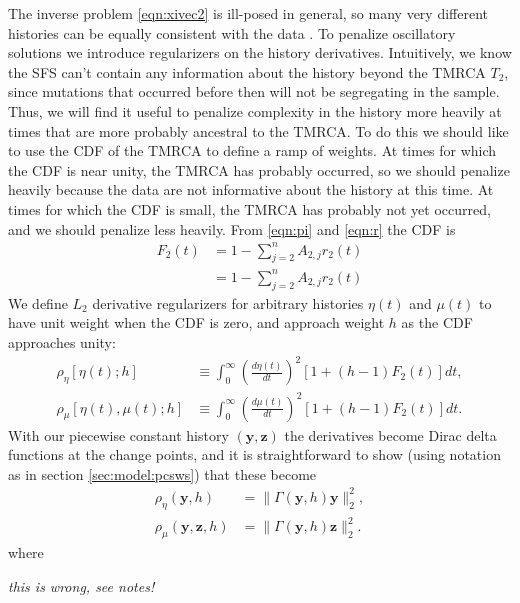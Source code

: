 \documentclass[11pt]{article}
\begin{document}
The inverse problem \eqref{eqn:xivec2} is ill-posed in general, so many very different histories can be equally consistent with the data \citep{oscillation paper? Yun's other papers?}.
To penalize oscillatory solutions we introduce regularizers on the history derivatives.
Intuitively, we know the SFS can't contain any information about the history beyond the TMRCA $T_2$, since mutations that occurred before then will not be segregating in the sample.
Thus, we will find it useful to penalize complexity in the history more heavily at times that are more probably ancestral to the TMRCA.
To do this we should like to use the CDF of the TMRCA to define a ramp of weights.
At times for which the CDF is near unity, the TMRCA has probably occurred, so we should penalize heavily because the data are not informative about the history at this time.
At times for which the CDF is small, the TMRCA has probably not yet occurred, and we should penalize less heavily.
From \eqref{eqn:pi} and \eqref{eqn:r} the CDF is
\begin{align}
F_2(t) &= 1 - \sum_{j=2}^n A_{2,j}r_2(t)\\
&= 1 - \sum_{j=2}^n A_{2,j}r_2(t)
\end{align}
We define $L_2$ derivative regularizers for arbitrary histories $\eta(t)$ and $\mu(t)$ to have unit weight when the CDF is zero, and approach weight $h$ as the CDF approaches unity:
\begin{align}
\rho_\eta[\eta(t); h] &\equiv \int_0^\infty\left(\frac{d\eta(t)}{dt}\right)^2\left[1+(h-1)F_2(t)\right]dt,\\
\rho_\mu[\eta(t), \mu(t); h] &\equiv \int_0^\infty\left(\frac{d\mu(t)}{dt}\right)^2\left[1+(h-1)F_2(t)\right]dt.
\end{align}
With our piecewise constant history $(\boldsymbol y, \boldsymbol z)$ the derivatives become Dirac delta functions at the change points, and it is straightforward to show (using notation as in section \ref{sec:model:pcsws}) that these become
\begin{align}
\rho_\eta(\boldsymbol y, h) &= \|\Gamma(\boldsymbol y, h) \boldsymbol y\|_2^2,\\
\rho_\mu(\boldsymbol y, \boldsymbol z, h) &= \|\Gamma(\boldsymbol y, h) \boldsymbol z\|_2^2.
\end{align}
where

\emph{this is wrong, see notes!}
\end{document}
